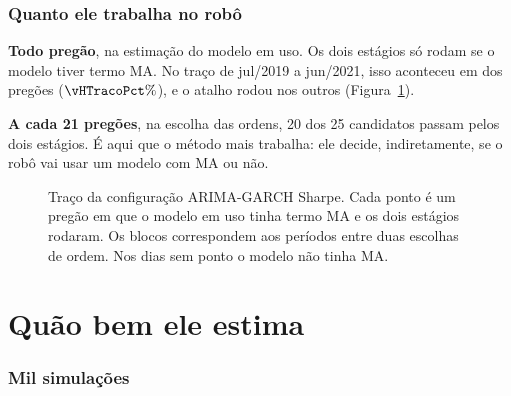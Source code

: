 \documentclass[11pt,a4paper]{article}
\newcommand{\arqr}[1]{../../../dados/resultados/robo_em_acao_2026-10-30/#1}
\begin{document}
\section{Quanto ele trabalha no robô}

\textbf{Todo pregão}, na estimação do modelo em uso. Os dois estágios só rodam se o modelo tiver termo MA. No traço de
jul/2019 a jun/2021, isso aconteceu em \vHTracoDois{} dos \vHTracoN{} pregões ($\vHTracoPct\%$), e o atalho rodou nos outros
\vHTracoUm{} (Figura~\ref{fig:traco}).

\textbf{A cada 21 pregões}, na escolha das ordens, 20 dos 25 candidatos passam pelos dois estágios. É aqui que o método
mais trabalha: ele decide, indiretamente, se o robô vai usar um modelo com MA ou não.

\begin{figure}[htbp]\centering
{}
\caption{Traço da configuração ARIMA-GARCH Sharpe. Cada ponto é um pregão em que o modelo em uso tinha termo MA e os
dois estágios rodaram. Os blocos correspondem aos períodos entre duas escolhas de ordem. Nos dias sem ponto o modelo
não tinha MA.}
\label{fig:traco}
\end{figure}

\part{Quão bem ele estima}

\section{Mil simulações}\label{sec:montecarlo}
\end{document}
